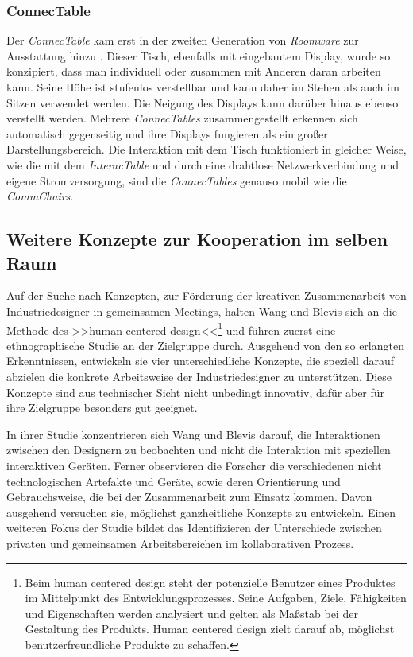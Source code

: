 \subsubsection{ConnecTable} 

Der \emph{ConnecTable} kam erst in der zweiten Generation von \emph{Roomware} zur Ausstattung hinzu \citep{Streitz:2002p214}. Dieser Tisch, ebenfalls mit eingebautem Display, wurde so konzipiert, dass man individuell oder zusammen mit Anderen daran arbeiten kann. Seine Höhe ist stufenlos verstellbar und kann daher im Stehen als auch im Sitzen verwendet werden. Die Neigung des Displays kann darüber hinaus ebenso verstellt werden. Mehrere \emph{ConnecTables} zusammengestellt erkennen sich automatisch gegenseitig und ihre Displays fungieren als ein großer Darstellungsbereich. Die Interaktion mit dem Tisch funktioniert in gleicher Weise, wie die mit dem \emph{InteracTable} und durch eine drahtlose Netzwerkverbindung und eigene Stromversorgung, sind die \emph{ConnecTables} genauso mobil wie die \emph{CommChairs}.

\subsection{Weitere Konzepte zur Kooperation im selben Raum}

Auf der Suche nach Konzepten, zur Förderung der kreativen Zusammenarbeit von Industriedesigner in gemeinsamen Meetings, halten Wang und Blevis \citep{Wang:2004p110} sich an die Methode des >>human centered design<<\footnote{Beim human centered design steht der potenzielle Benutzer eines Produktes im Mittelpunkt des Entwicklungsprozesses. Seine Aufgaben, Ziele, Fähigkeiten und Eigenschaften werden analysiert und gelten als Maßstab bei der Gestaltung des Produkts. Human centered design zielt darauf ab, möglichst benutzerfreundliche Produkte zu schaffen.} und führen zuerst eine ethnographische Studie an der Zielgruppe durch. Ausgehend von den so erlangten Erkenntnissen, entwickeln sie vier unterschiedliche Konzepte, die speziell darauf abzielen die konkrete Arbeitsweise der Industriedesigner zu unterstützen. Diese Konzepte sind aus technischer Sicht nicht unbedingt innovativ, dafür aber für ihre Zielgruppe besonders gut geeignet.

In ihrer Studie konzentrieren sich Wang und Blevis \citep{Wang:2004p110} darauf, die Interaktionen zwischen den Designern zu beobachten und nicht die Interaktion mit speziellen interaktiven Geräten. Ferner observieren die Forscher die verschiedenen nicht technologischen Artefakte und Geräte, sowie deren Orientierung und Gebrauchsweise, die bei der Zusammenarbeit zum Einsatz kommen. Davon ausgehend versuchen sie, möglichst ganzheitliche Konzepte zu entwickeln. Einen weiteren Fokus der Studie bildet das Identifizieren der Unterschiede zwischen privaten und gemeinsamen Arbeitsbereichen im kollaborativen Prozess.

